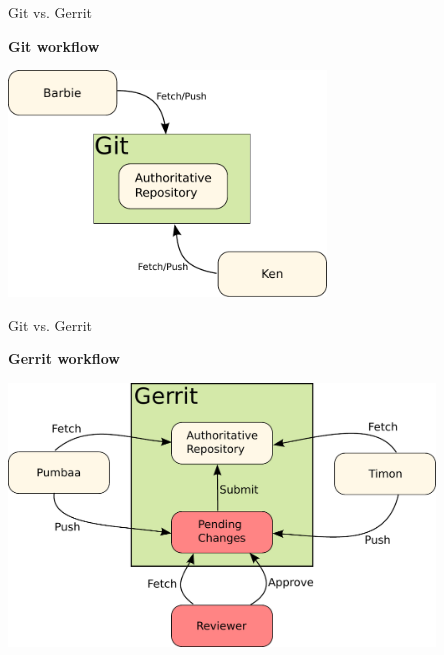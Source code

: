 \begin{frame}{Git vs. Gerrit}
\vspace{-0.2cm}
\begin{center}
  \textbf{Git workflow}
\end{center}
\vspace{0.2cm}
\begin{center}
  \includegraphics[height=6cm]{img/gerrit-workflow-classic.pdf}
\end{center}
\end{frame}

\begin{frame}{Git vs. Gerrit}
  \begin{center}
\textbf{Gerrit workflow}
\end{center}
\begin{center}
  \includegraphics[height=7cm]{img/gerrit-workflow-gerrit.pdf}
\end{center}
\end{frame}

